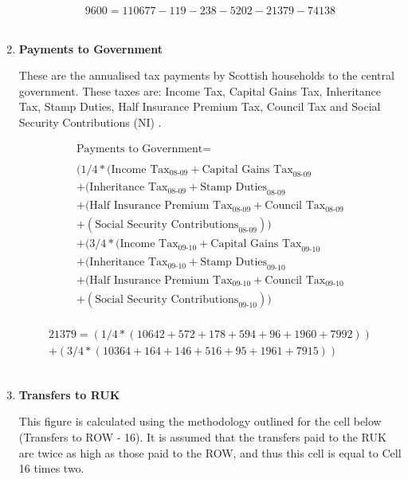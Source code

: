 \begin{enumerate}
\begin{equation} \nonumber
9600 = 110677-119-238-5202-21379-74138
\end{equation}\\


\item \textbf {Payments to Government}

These are the annualised tax payments by Scottish households to the central government. These taxes are: Income Tax, Capital Gains Tax, Inheritance Tax, Stamp Duties, Half Insurance Premium Tax, Council Tax and Social Security Contributions (NI) \cite{ScotGov2013b}.

\begin{equation}
\begin{split}
\text{Payments to Government} =  \\ \\
(1/4*(\text{Income Tax}_\text{08-09}+\text{Capital Gains Tax}_\text{08-09}\\
+(\text{Inheritance Tax}_\text{08-09}+\text{Stamp Duties}_\text{08-09}\\
+(\text{Half Insurance Premium Tax}_\text{08-09}+\text{Council Tax}_\text{08-09}\\
+(\text{Social Security Contributions}_\text{08-09}))\\
+(3/4*(\text{Income Tax}_\text{09-10}+\text{Capital Gains Tax}_\text{09-10}\\
+(\text{Inheritance Tax}_\text{09-10}+\text{Stamp Duties}_\text{09-10}\\
+(\text{Half Insurance Premium Tax}_\text{09-10}+\text{Council Tax}_\text{09-10}\\
+(\text{Social Security Contributions}_\text{09-10}))\\
\end{split} \label{eq:2.5.17}
\end{equation}

\begin{equation} \nonumber
\begin{split}
21379=(1/4*(10642+572+178+594+96+1960+7992))\\
+(3/4*(10364+164+146+516+95+1961+7915))
\end{split}
\end{equation}\\


\item \textbf {Transfers to RUK}

This figure is calculated using the methodology outlined for the cell below (Transfers to ROW - 16). It is assumed that the transfers paid to the RUK are twice as high as those paid to the ROW, and thus this cell is equal to Cell 16 times two.


\end{enumerate}
